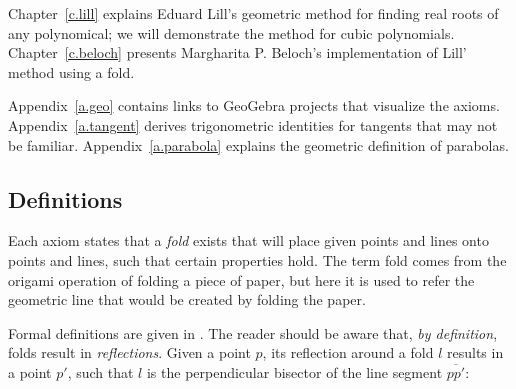 Chapter~\ref{c.lill} explains Eduard Lill's geometric method for finding real roots of any polynomical; we will demonstrate the method for cubic polynomials. Chapter~\ref{c.beloch} presents Margharita P. Beloch's implementation of Lill' method using a fold.

Appendix~\ref{a.geo} contains links to GeoGebra projects that visualize the axioms. Appendix~\ref{a.tangent} derives trigonometric identities for tangents that may not be familiar. Appendix~\ref{a.parabola} explains the geometric definition of parabolas.

\subsection*{Definitions}

Each axiom states that a \emph{fold} exists that will place given points and lines onto points and lines, such that certain properties hold. The term fold comes from the origami operation of folding a piece of paper, but here it is used to refer the geometric line that would be created by folding the paper.

Formal definitions are given in \cite[Chapter~10]{martin}. The reader should be aware that, \emph{by definition}, folds result in \emph{reflections}. Given a point $p$, its reflection around a fold $l$ results in a point $p'$, such that $l$ is the perpendicular bisector of the line segment $\overline{pp'}$:


\begin{center}
\end{center}
